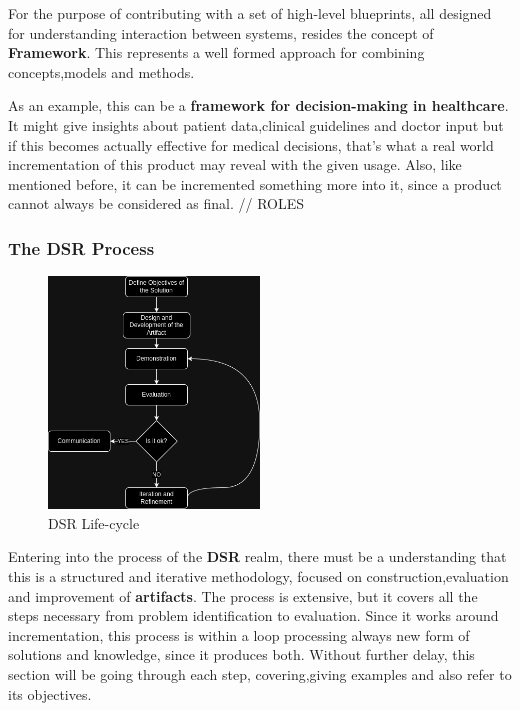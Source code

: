 For the purpose of contributing with a set of high-level blueprints, all designed for understanding interaction between systems, resides the concept of \textbf{Framework}. This represents a well formed approach for combining concepts,models and methods.

As an example, this can be a \textbf{framework for decision-making in healthcare}. It might give insights about patient data,clinical guidelines and doctor input but if this becomes actually effective for medical decisions, that's what a real world incrementation of this product may reveal with the given usage. Also, like mentioned before, it can be incremented something more into it, since a product cannot always be considered as final.
// ROLES

\subsubsection{The DSR Process}
\begin{figure}[H]
    \centering
    \includegraphics[width=0.5\textwidth]{assets/tools/dsr/DSR.drawio.png} %
    \caption{DSR Life-cycle}
    \label{fig:sample-image} 
\end{figure}
Entering into the process of the \textbf{DSR} realm, there must be a understanding that this is a structured and iterative methodology, focused on construction,evaluation and improvement of \textbf{artifacts}. The process is extensive, but it covers all the steps necessary from problem identification to evaluation. Since it works around incrementation, this process is within a loop processing always new form of solutions and knowledge, since it produces both.
Without further delay, this section will be going through each step, covering,giving examples and also refer to its objectives. 

